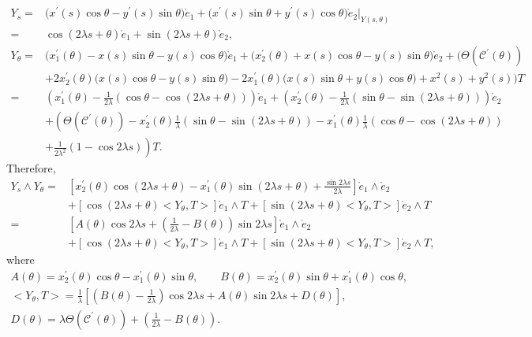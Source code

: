 \documentclass[pdftex]{sigma}
\numberwithin{equation}{section}
\begin{document}
\begin{align*} %
Y_{s}={}&\bigl(x^{\prime }(s)\cos \theta-y^{\prime }(s)\sin \theta \bigr)
\mathring e_1+\bigl(x^{\prime }(s)\sin \theta+y^{\prime }(s)\cos \theta \bigr)
\mathring e_2|_{Y(s,\theta)} \\
={}&\cos{(2\lambda s+\theta)}\mathring e_1+\sin{(2\lambda s+\theta)}\mathring
e_2, \\
Y_{\theta}={}&\bigl(x^{\prime }_{1}(\theta)-x(s)\sin \theta-y(s)\cos \theta
\bigr)\mathring e_1+\bigl(x^{\prime }_{2}(\theta)+x(s)\cos \theta-y(s)\sin
\theta \bigr)\mathring e_2 +\bigl(\Theta(\mathcal{C}^{\prime }(\theta))\\
&+2x^{\prime }_{2}(\theta)
\bigl(x(s)\cos \theta-y(s)\sin \theta \bigr)-2x^{\prime }_{1}(\theta)\bigl(
x(s)\sin \theta+y(s)\cos{\theta}\bigr)
+x^2(s)+y^2(s)\bigr)T \\
={}&\left(x^{\prime }_{1}(\theta)-\frac{1}{2\lambda}(\cos{\theta}-\cos{
(2\lambda s+\theta)})\right)\mathring e_1+\left(x^{\prime }_{2}(\theta)-\frac{1
}{2\lambda}(\sin{\theta}-\sin{(2\lambda s+\theta)})\right)\mathring e_2 \\
& +\left(\Theta(\mathcal{C}^{\prime }(\theta))-x^{\prime }_{2}(\theta)
\frac{1}{\lambda}(\sin{\theta}-\sin{(2\lambda s+\theta)})-x^{\prime
}_{1}(\theta)\frac{1}{\lambda}(\cos{\theta}-\cos{(2\lambda s+\theta)}) \right.\\
&\left. +\frac{1}{2\lambda^2}(1-\cos{2\lambda s})\right)T.
\end{align*}
Therefore,
\begin{align}
Y_{s}\wedge Y_{\theta}={}&\left[x^{\prime }_{2}(\theta)\cos{(2\lambda
s+\theta)}-x^{\prime }_{1}(\theta)\sin{(2\lambda s+\theta)}+\frac{\sin{
2\lambda s}}{2\lambda}\right]\mathring e_{1}\wedge \mathring e_{2} \nonumber\\
& +[\cos{(2\lambda s+\theta)}\big<Y_{\theta},T\big>]\mathring
e_{1}\wedge T+[\sin{(2\lambda s+\theta)}\big<Y_{\theta},T\big>]\mathring
e_{2}\wedge T \nonumber\\
={}&\left[A(\theta)\cos{2\lambda s}+\left(\frac{1}{2\lambda}
-B(\theta)\right)\sin{2\lambda s}\right]\mathring e_{1}\wedge \mathring e_{2}\nonumber
\\
&+[\cos{(2\lambda s+\theta)}\big<Y_{\theta},T\big>]\mathring
e_{1}\wedge T+[\sin{(2\lambda s+\theta)}\big<Y_{\theta},T\big>]\mathring
e_{2}\wedge T,\label{cofra1}
\end{align}
where
\begin{gather}
A(\theta)=x^{\prime }_{2}(\theta)\cos{\theta}-x^{\prime }_{1}(\theta)\sin{
\theta},\qquad
B(\theta)=x^{\prime }_{2}(\theta)\sin{\theta}+x^{\prime }_{1}(\theta)\cos{
\theta}, \nonumber\\
\big<Y_{\theta},T\big>=\frac{1}{\lambda}\left[\left(B(\theta)-\frac{1}{
2\lambda}\right)\cos{2\lambda s}+A(\theta)\sin{2\lambda s}+D(\theta)\right],\nonumber
\\
D(\theta)=\lambda \Theta(\mathcal{C}^{\prime }(\theta))+\left(\frac{1}{
2\lambda}-B(\theta)\right). \label{cofra2}
\end{gather}
\end{document}
